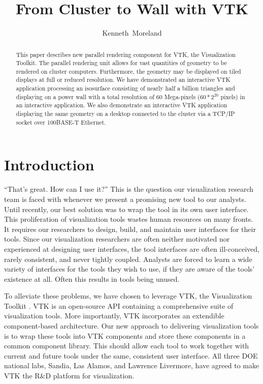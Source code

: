 \documentclass[twocolumn]{article}
\title{From Cluster to Wall with VTK}
\author{Kenneth~Moreland}
\begin{document}
\maketitle

\begin{abstract}
  This paper describes new parallel rendering component for VTK, the
  Visualization Toolkit.  The parallel rendering unit allows for vast
  quantities of geometry to be rendered on cluster computers.  Furthermore,
  the geometry may be displayed on tiled displays at full or reduced
  resolution.  We have demonstrated an interactive VTK application
  processing an isosurface consisting of nearly half a billion triangles
  and displaying on a power wall with a total resolution of 60 Mega-pixels
  ($60*2^{20}$ pixels) in an interactive application.  We also demonstrate
  an interactive VTK application displaying the same geometry on a desktop
  connected to the cluster via a TCP/IP socket over 100BASE-T Ethernet.
\end{abstract}

\section{Introduction}
\label{sec:introduction}

``That's great.  How can I use it?''  This is the question our
visualization research team is faced with whenever we present a promising
new tool to our analysts.  Until recently, our best solution was to wrap
the tool in its own user interface.  This proliferation of visualization
tools wastes human resources on many fronts.  It requires our researchers
to design, build, and maintain user interfaces for their tools.  Since our
visualization researchers are often neither motivated nor experienced at
designing user interfaces, the tool interfaces are often ill-conceived,
rarely consistent, and never tightly coupled.  Analysts are forced to learn
a wide variety of interfaces for the tools they wish to use, if they are
aware of the tools' existence at all.  Often this results in tools being
unused.

To alleviate these problems, we have chosen to leverage VTK, the
Visualization Toolkit \cite{Schroeder98}.  VTK is an open-source API
containing a comprehensive suite of visualization tools.  More importantly,
VTK incorporates an extendible component-based architecture.  Our new
approach to delivering visualization tools is to wrap these tools into VTK
components and store these components in a common component library.  This
should allow each tool to work together with current and future tools under
the same, consistent user interface.  All three DOE national labs, Sandia,
Las Alamos, and Lawrence Livermore, have agreed to make VTK the R\&D
platform for visualization.
\end{document}
